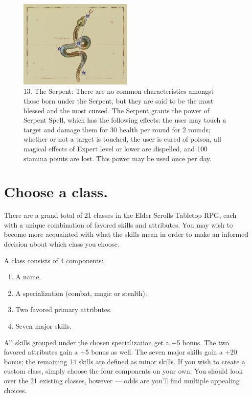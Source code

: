 \documentclass[12pt]{book}
\begin{document}
\begin{figure}[H]
\includegraphics[width=0.5\textwidth]{Serpent.png}
\centering
\caption*{13. The Serpent: There are no common characteristics amongst those born under the Serpent, but they are said to be the most blessed and the most cursed. The Serpent grants the power of Serpent Spell, which has the following effects: the user may touch a target and damage them for 30 health per round for 2 rounds; whether or not a target is touched, the user is cured of poison, all magical effects of Expert level or lower are dispelled, and 100 stamina points are lost. This power may be used once per day.}
\end{figure}

\newpage
\section{Choose a class.}
There are a grand total of 21 classes in the Elder Scrolls Tabletop RPG, each with a unique combination of favored skills and attributes. You may wish to become more acquainted with what the skills mean in order to make an informed decision about which class you choose.

A class consists of 4 components:
\begin{enumerate}
	\item A name.
	\item A specialization (combat, magic or stealth).
	\item Two favored primary attributes.
	\item Seven major skills.
\end{enumerate}

All skills grouped under the chosen specialization get a +5 bonus. The two favored attributes gain a +5 bonus as well. The seven major skills gain a +20 bonus; the remaining 14 skills are defined as minor skills. If you wish to create a custom class, simply choose the four components on your own. You should look over the 21 existing classes, however --- odds are you'll find multiple appealing choices.\\
\end{document}
